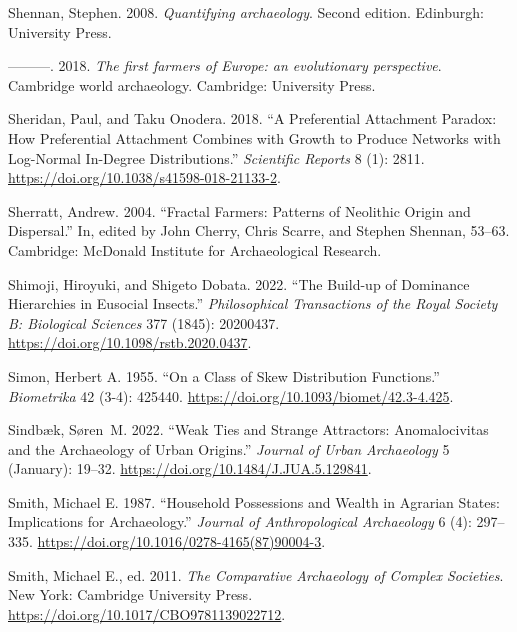 \documentclass[
  12pt,
  a4paper, twoside]{book}
\newlength{\cslhangindent}
\newlength{\cslentryspacingunit} %
\newenvironment{CSLReferences}[2] %
 {%
  \setlength{\parindent}{0pt}
  \ifodd #1
  \let\oldpar\par
  \def\par{\hangindent=\cslhangindent\oldpar}
  \fi
  \setlength{\parskip}{#2\cslentryspacingunit}
 }%
 {}
\begin{document}
\begin{CSLReferences}{1}{0}
\leavevmode{}%
Shennan, Stephen. 2008. \emph{Quantifying archaeology}. Second edition. Edinburgh: University Press.

\leavevmode{}%
---------. 2018. \emph{The first farmers of Europe: an evolutionary perspective}. Cambridge world archaeology. Cambridge: University Press.

\leavevmode{}%
Sheridan, Paul, and Taku Onodera. 2018. {``A Preferential Attachment Paradox: How Preferential Attachment Combines with Growth to Produce Networks with Log-Normal In-Degree Distributions.''} \emph{Scientific Reports} 8 (1): 2811. \url{https://doi.org/10.1038/s41598-018-21133-2}.

\leavevmode{}%
Sherratt, Andrew. 2004. {``Fractal Farmers: Patterns of Neolithic Origin and Dispersal.''} In, edited by John Cherry, Chris Scarre, and Stephen Shennan, 53--63. Cambridge: McDonald Institute for Archaeological Research.

\leavevmode{}%
Shimoji, Hiroyuki, and Shigeto Dobata. 2022. {``The Build-up of Dominance Hierarchies in Eusocial Insects.''} \emph{Philosophical Transactions of the Royal Society B: Biological Sciences} 377 (1845): 20200437. \url{https://doi.org/10.1098/rstb.2020.0437}.

\leavevmode{}%
Simon, Herbert A. 1955. {``On a Class of Skew Distribution Functions.''} \emph{Biometrika} 42 (3-4): 425440. \url{https://doi.org/10.1093/biomet/42.3-4.425}.

\leavevmode{}%
Sindbæk, Søren~M. 2022. {``Weak Ties and Strange Attractors: Anomalocivitas and the Archaeology of Urban Origins.''} \emph{Journal of Urban Archaeology} 5 (January): 19--32. \url{https://doi.org/10.1484/J.JUA.5.129841}.

\leavevmode{}%
Smith, Michael E. 1987. {``Household Possessions and Wealth in Agrarian States: Implications for Archaeology.''} \emph{Journal of Anthropological Archaeology} 6 (4): 297--335. \url{https://doi.org/10.1016/0278-4165(87)90004-3}.

\leavevmode{}%
Smith, Michael E., ed. 2011. \emph{The Comparative Archaeology of Complex Societies}. New York: Cambridge University Press. \url{https://doi.org/10.1017/CBO9781139022712}.


\end{CSLReferences}
\end{document}
